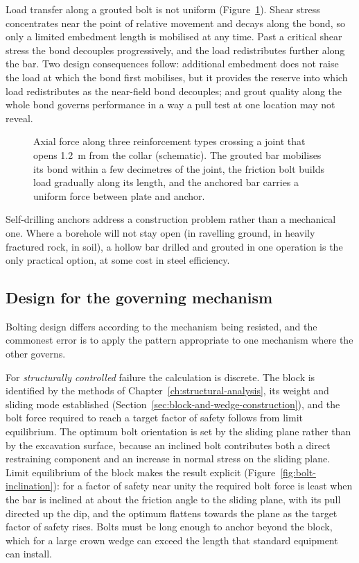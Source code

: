 Load transfer along a grouted bolt is not uniform
(Figure~\ref{fig:bolt-load-transfer}). Shear stress concentrates
near the point of relative movement and decays along the bond, so only a
limited embedment length is mobilised at any time. Past a critical shear
stress the bond decouples progressively, and the load redistributes further
along the bar. Two design consequences follow: additional embedment does not
raise the load at which the bond first mobilises, but it provides the reserve
into which load redistributes as the near-field bond decouples; and grout
quality along the whole
bond governs performance in a way a pull test at one location may not reveal.

\begin{figure}[htbp]
\centering
{}
\caption{Axial force along three reinforcement types crossing a joint that opens 1.2~m from the collar (schematic). The grouted bar mobilises its bond within a few decimetres of the joint, the friction bolt builds load gradually along its length, and the anchored bar carries a uniform force between plate and anchor.}
\label{fig:bolt-load-transfer}
\end{figure}

Self-drilling anchors address a construction problem rather than a
mechanical one. Where a borehole will not stay open
(in ravelling ground, in heavily fractured rock, in soil), a hollow bar
drilled and grouted in one operation is the only practical option, at some
cost in steel efficiency.

\subsection{Design for the governing mechanism}
\label{sec:design-mechanism}

Bolting design differs according to the mechanism being resisted, and
the commonest error is to apply the pattern appropriate to one mechanism where
the other governs.

For \emph{structurally controlled} failure the calculation is discrete. The
block is identified by the methods of
Chapter~\ref{ch:structural-analysis}, its weight and sliding mode established (Section~\ref{sec:block-and-wedge-construction}),
and the bolt force required to reach a target factor of safety follows from
limit equilibrium. The optimum bolt orientation is set by the
sliding plane rather than by the excavation surface, because an inclined bolt
contributes both a direct restraining component and an increase in normal
stress on the sliding plane. Limit equilibrium of the block makes the result
explicit (Figure~\ref{fig:bolt-inclination}): for a factor of safety near unity the required bolt force is least
when the bar is inclined at about the friction angle to the sliding plane,
with its pull directed up the dip, and the optimum flattens towards the plane
as the target factor of safety rises. Bolts must be long enough to
anchor beyond the block, which for a large crown wedge can exceed the length
that standard equipment can install.

